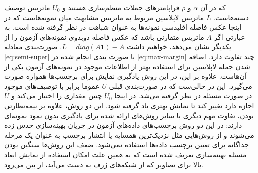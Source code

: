 که در آن $\alpha$ و $\rho$ فراپامترهای جملات منظم‌سازی هستند و $U_0$ ماتریس توصیف دسته‌هاست.  $L$ ماتریس لاپلاسین مربوط به ماتریس مشابهت میان نمونه‌هاست که در اینجا عکس فاصله اقلیدسی نمونه‌ها به عنوان شباهت در نظر گرفته شده است. به عبارتی اگر $A$ ماتریس متقارنی باشد که عکس فاصله دوبدوی نمونه‌های آزمون را از یکدیگر نشان می‌دهد، خواهیم داشت 
$ L = diag(A\mathbf{1}) - A$.
صورت‌بندی معادله \eqref{eq:semi-super} با صورت بندی انجام شده در \eqref{eq:max-margin} چند تفاوت دارد. اضافه شدن جمله لاپلاسین برای استفاده بهتر از اطلاعات موجود در نمونه‌های آزمون یکی از آن‌هاست. علاوه بر این، در این روش یادگیری نمایش برای برچسب‌ها همواره صورت می‌گیرد. این در حالی‌ست که در صورت‌بندی قبلی $U$ عموما برابر با توصیف‌های موجود در صورت مسئله در نظر گرفته می‌شد. در اینجا $U_0$ چنین مقداری را اختیار می‌کند و $U$ اجازه دارد تغییر کند تا نمایش بهتری یاد گرفته شود. این دو روش، علاوه بر نیمه‌نظارتی بودن، تفاوت مهم دیگری با سایر روش‌های ارائه شده برای یادگیری بدون نمود نمونه‌ای دارند: در این دو روش برچسب‌های داده‌های آزمون در جریان بهینه‌سازی حدس زده می‌شوند و از روش‌هایی مثل نزدیک‌ترین همسایه یا انتشار برچسب به عنوان یک مرحله جداگانه برای تعیین برچسب داده‌ها استفاده نمی‌شود. ضعف این روش‌ها سنگین بودن مسئله بهینه‌سازی تعریف شده است که به همین علت امکان استفاده از نمایش ابعاد بالا برای تصاویر که از شبکه‌های ژرف به دست می‌آید، از بین می‌رود.

